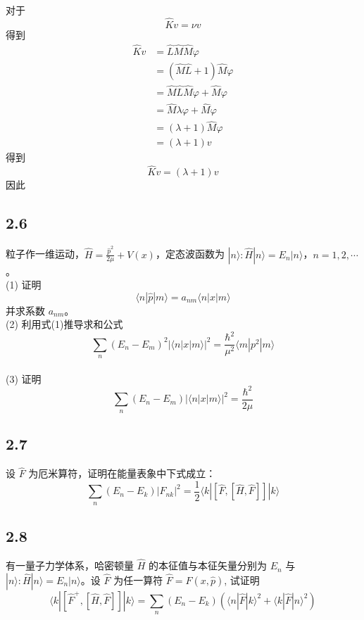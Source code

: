 对于
\begin{equation}
    \hat{K}v=\nu v
\end{equation}
得到
\begin{equation}
    \begin{aligned}
        \hat{K}v&=\hat{L}\hat{M}\hat{M}\varphi 
\\
&=\left( \hat{M}\hat{L}+1 \right) \hat{M}\varphi 
\\
&=\hat{M}\hat{L}\hat{M}\varphi +\hat{M}\varphi 
\\
&=\hat{M}\lambda \varphi +\hat{M}\varphi 
\\
&=\left( \lambda +1 \right) \hat{M}\varphi 
\\
&=\left( \lambda +1 \right) v
    \end{aligned}
\end{equation}
得到
\begin{equation}
    \hat{K}v=\left( \lambda +1 \right) v
\end{equation}
因此

\subsection{2.6}
粒子作一维运动，$\hat{H} = \frac{\hat{p}^2}{2\mu} + V(x)$，定态波函数为 $|n\rangle : \hat{H}|n\rangle = E_n |n\rangle$，$n = 1, 2, \cdots$。
\\(1) 证明
$$\langle n | \hat{p} | m \rangle = a_{nm} \langle n | x | m \rangle $$
并求系数 $a_{nm}$。
\\(2) 利用式(1)推导求和公式
$$\sum_n (E_n - E_m)^2 | \langle n | x | m \rangle |^2 = \frac{\hbar^2}{\mu^2} \langle m | p^2 | m \rangle $$
\\(3) 证明
$$\sum_n (E_n - E_m) | \langle n | x | m \rangle |^2 = \frac{\hbar^2}{2\mu} $$

\subsection{2.7}
设 $\hat{F}$ 为厄米算符，证明在能量表象中下式成立：
$$\sum_{n} (E_n - E_k) |F_{nk}|^2 = \frac{1}{2} \langle k| [\hat{F}, [\hat{H}, \hat{F}]] |k \rangle$$

\subsection{2.8}
有一量子力学体系，哈密顿量 $\hat{H}$ 的本征值与本征矢量分别为 $E_n$ 与 $|n\rangle: \hat{H}|n\rangle = E_n|n\rangle$。设 $\hat{F}$ 为任一算符 $\hat{F} = \hat{F}(x, \hat{p})$, 试证明
$$\langle k|[\hat{F}^+, [\hat{H}, \hat{F}]] |k \rangle = \sum_{n} (E_n - E_k) \left( \langle n|\hat{F}|k\rangle^2 + \langle k|\hat{F}|n\rangle^2 \right)$$

